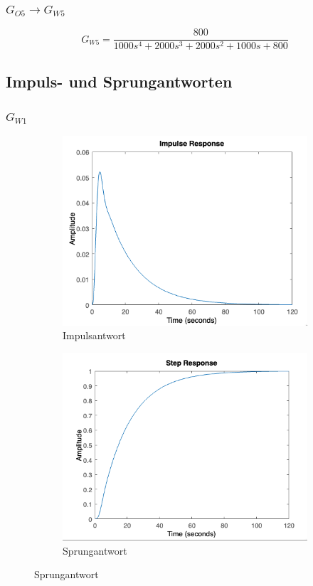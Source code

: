 \documentclass{article}
\begin{document}
				\subsubsection{$G_{O5} \rightarrow G_{W5}$}
					$$G_{W5} = \frac{800}{1000s^4 + 2000s^3 + 2000s^2 + 1000s + 800}$$
					
			\subsection{Impuls- und Sprungantworten}
 				\subsubsection{$G_{W1}$}
 					\begin{figure}[h]
 						\begin{subfigure}{0.5\textwidth}
 							\includegraphics[width=1.2\linewidth]{./Impulsantwort_GW1.png}
						    \caption{Impulsantwort}
						    \label{fig:subimg1_1}
					    \end{subfigure}
					    \begin{subfigure}{0.5\textwidth}
					    		\includegraphics[width=1.2\linewidth]{./Sprungantwort_GW1.png}
					    		\caption{Sprungantwort}
					    		\label{fig:subimg1_2}
					    \end{subfigure}
 					\end{figure}
\newpage
\end{document}
